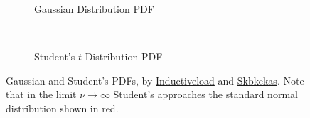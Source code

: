 \begin{figure}
  \centering

  \begin{subfigure}[b]{0.48\textwidth}\centering
  \caption{Gaussian Distribution PDF}
  \label{fig:dist:gaus}
  \end{subfigure}
  ~
  \begin{subfigure}[b]{\wd\largestimage}\centering
    \usebox{\largestimage}
  \caption{Student's $t$-Distribution PDF}
  \label{fig:dist:student_t}
  \end{subfigure}
\caption{
Gaussian and Student's \tdist PDFs,
by \href{https://en.wikipedia.org/wiki/File:Normal_Distribution_PDF.svg}{Inductiveload}
and \href{https://en.wikipedia.org/wiki/File:Student_t_pdf.svg}{Skbkekas}.
Note that in the limit $\nu \to \infty$ Student's \tdist
approaches the standard normal distribution shown in red.
\label{fig:dist:gaus_student_t}
}
\end{figure}

